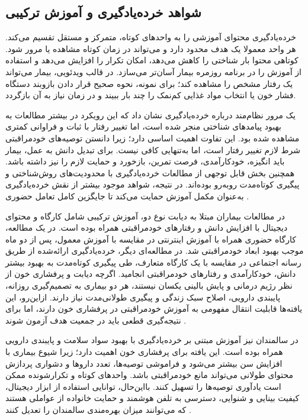 \subsection{شواهد خرده‌یادگیری و آموزش ترکیبی}
خرده‌یادگیری محتوای آموزشی را به واحدهای کوتاه، متمرکز و مستقل تقسیم می‌کند. هر واحد معمولا یک هدف محدود دارد و می‌تواند در زمان کوتاه مشاهده یا مرور شود. کوتاهی محتوا بار شناختی را کاهش می‌دهد، امکان تکرار را افزایش می‌دهد و استفاده از آموزش را در برنامه روزمره بیمار آسان‌تر می‌سازد. در قالب ویدئویی، بیمار می‌تواند یک رفتار مشخص را مشاهده کند؛ برای نمونه، نحوه صحیح قرار دادن بازوبند دستگاه فشار خون یا انتخاب مواد غذایی کم‌نمک را چند بار ببیند و در زمان نیاز به آن بازگردد.
\par
یک مرور نظام‌مند درباره خرده‌یادگیری نشان داد که این رویکرد در بیشتر مطالعات به بهبود پیامدهای شناختی منجر شده است، اما تغییر رفتار با ثبات و فراوانی کمتری مشاهده شده بود. این تفاوت اهمیت اساسی دارد؛ زیرا دانستن توصیه‌های خودمراقبتی شرط لازم تغییر رفتار است، اما به‌تنهایی کافی نیست. برای تبدیل دانش به عمل، بیمار باید انگیزه، خودکارآمدی، فرصت تمرین، بازخورد و حمایت لازم را نیز داشته باشد. همچنین بخش قابل توجهی از مطالعات خرده‌یادگیری با محدودیت‌های روش‌شناختی و پیگیری کوتاه‌مدت روبه‌رو بوده‌اند. در نتیجه، شواهد موجود بیشتر از نقش خرده‌یادگیری به‌عنوان مکمل آموزش حمایت می‌کند تا جایگزین کامل تعامل حضوری \cite{wang2020microlearning}.
\par
در مطالعات بیماران مبتلا به دیابت نوع دو، آموزش ترکیبی شامل کارگاه و محتوای دیجیتال با افزایش دانش و رفتارهای خودمراقبتی همراه بوده است. در یک مطالعه، کارگاه حضوری همراه با آموزش اینترنتی در مقایسه با آموزش معمول، پس از دو ماه موجب بهبود ابعاد خودمراقبتی شد. در مطالعه‌ای دیگر، خرده‌یادگیری ارائه‌شده از طریق رسانه اجتماعی در مقایسه با یک کارگاه متعارف، طی پیگیری کوتاه‌مدت به بهبود بیشتر دانش، خودکارآمدی و رفتارهای خودمراقبتی انجامید. اگرچه دیابت و پرفشاری خون از نظر رژیم درمانی و پایش بالینی یکسان نیستند، هر دو بیماری به تصمیم‌گیری روزانه، پایبندی دارویی، اصلاح سبک زندگی و پیگیری طولانی‌مدت نیاز دارند. ازاین‌رو، این یافته‌ها قابلیت انتقال مفهومی به آموزش خودمراقبتی در پرفشاری خون دارند، اما برای نتیجه‌گیری قطعی باید در جمعیت هدف آزمون شوند \cite{ghiyasvandian2023blended,rahbar2024socialmedia}.
\par
در سالمندان نیز آموزش مبتنی بر خرده‌یادگیری با بهبود سواد سلامت و پایبندی دارویی همراه بوده است. این یافته برای پرفشاری خون اهمیت دارد؛ زیرا شیوع بیماری با افزایش سن بیشتر می‌شود و فراموشی توصیه‌ها، تعدد داروها و دشواری پردازش محتوای طولانی می‌تواند مانع خودمراقبتی باشد. واحدهای کوتاه و تکرارشونده ممکن است یادآوری توصیه‌ها را تسهیل کنند. بااین‌حال، توانایی استفاده از ابزار دیجیتال، کیفیت بینایی و شنوایی، دسترسی به تلفن هوشمند و حمایت خانواده از عواملی هستند که می‌توانند میزان بهره‌مندی سالمندان را تعدیل کنند \cite{poorcheraghi2025microlearning}.
